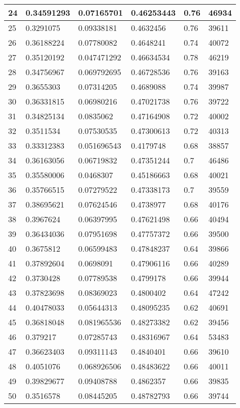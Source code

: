 \begin{longtable}{|l|l|l|l|l|l|}
24 & 0.34591293 & 0.07165701 & 0.46253443 & 0.76 & 46934 \\ \hline 
25 & 0.3291075 & 0.09338181 & 0.4632456 & 0.76 & 39611 \\ \hline 
26 & 0.36188224 & 0.07780082 & 0.4648241 & 0.74 & 40072 \\ \hline 
27 & 0.35120192 & 0.047471292 & 0.46634534 & 0.78 & 46219 \\ \hline 
28 & 0.34756967 & 0.069792695 & 0.46728536 & 0.76 & 39163 \\ \hline 
29 & 0.3655303 & 0.07314205 & 0.4689088 & 0.74 & 39987 \\ \hline 
30 & 0.36331815 & 0.06980216 & 0.47021738 & 0.76 & 39722 \\ \hline 
31 & 0.34825134 & 0.0835062 & 0.47164908 & 0.72 & 40002 \\ \hline 
32 & 0.3511534 & 0.07530535 & 0.47300613 & 0.72 & 40313 \\ \hline 
33 & 0.33312383 & 0.051696543 & 0.4179748 & 0.68 & 38857 \\ \hline 
34 & 0.36163056 & 0.06719832 & 0.47351244 & 0.7 & 46486 \\ \hline 
35 & 0.35580006 & 0.0468307 & 0.45186663 & 0.68 & 40021 \\ \hline 
36 & 0.35766515 & 0.07279522 & 0.47338173 & 0.7 & 39559 \\ \hline 
37 & 0.38695621 & 0.07624546 & 0.4738977 & 0.68 & 40176 \\ \hline 
38 & 0.3967624 & 0.06397995 & 0.47621498 & 0.66 & 40494 \\ \hline 
39 & 0.36434036 & 0.07951698 & 0.47757372 & 0.66 & 39500 \\ \hline 
40 & 0.3675812 & 0.06599483 & 0.47848237 & 0.64 & 39866 \\ \hline 
41 & 0.37892604 & 0.0698091 & 0.47906116 & 0.66 & 40289 \\ \hline 
42 & 0.3730428 & 0.07789538 & 0.4799178 & 0.66 & 39944 \\ \hline 
43 & 0.37823698 & 0.08369023 & 0.4800402 & 0.64 & 47242 \\ \hline 
44 & 0.40478033 & 0.05644313 & 0.48095235 & 0.62 & 40691 \\ \hline 
45 & 0.36818048 & 0.081965536 & 0.48273382 & 0.62 & 39456 \\ \hline 
46 & 0.379217 & 0.07285743 & 0.48316967 & 0.64 & 53483 \\ \hline 
47 & 0.36623403 & 0.09311143 & 0.4840401 & 0.66 & 39610 \\ \hline 
48 & 0.4051076 & 0.068926506 & 0.48483622 & 0.66 & 40011 \\ \hline 
49 & 0.39829677 & 0.09408788 & 0.4862357 & 0.66 & 39835 \\ \hline 
50 & 0.3516578 & 0.08445205 & 0.48782793 & 0.66 & 39744 \\ \hline 
\end{longtable}